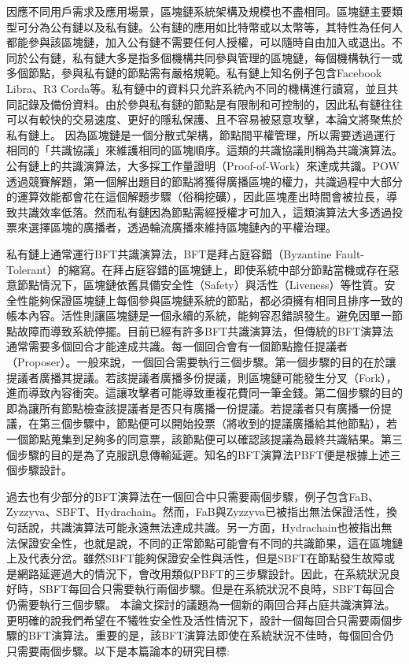 因應不同用戶需求及應用場景，區塊鏈系統架構及規模也不盡相同。區塊鏈主要類型可分為公有鏈以及私有鏈。公有鏈的應用如比特幣\cite{Bitcoin}或以太幣\cite{Ethereum}等，其特性為任何人都能參與該區塊鏈，加入公有鏈不需要任何人授權，可以隨時自由加入或退出。不同於公有鏈，私有鏈大多是指多個機構共同參與管理的區塊鏈，每個機構執行一或多個節點，參與私有鏈的節點需有嚴格規範。私有鏈上知名例子包含Facebook Libra\cite{STEVE_HANNA2010}、R3 Corda\cite{R3}等。私有鏈中的資料只允許系統內不同的機構進行讀寫，並且共同記錄及備份資料。由於參與私有鏈的節點是有限制和可控制的，因此私有鏈往往可以有較快的交易速度、更好的隱私保護、且不容易被惡意攻擊，本論文將聚焦於私有鏈上。
因為區塊鏈是一個分散式架構，節點間平權管理，所以需要透過運行相同的「共識協議」來維護相同的區塊順序。這類的共識協議則稱為共識演算法。公有鏈上的共識演算法，大多採工作量證明（Proof-of-Work）來達成共識。POW透過競賽解題，第一個解出題目的節點將獲得廣播區塊的權力，共識過程中大部分的運算效能都會花在這個解題步驟（俗稱挖礦），因此區塊產出時間會被拉長，導致共識效率低落。然而私有鏈因為節點需經授權才可加入，這類演算法大多透過投票來選擇區塊的廣播者，透過輪流廣播來維持區塊鏈內的平權治理。

私有鏈上通常運行BFT共識演算法，BFT是拜占庭容錯（Byzantine Fault-Tolerant）的縮寫。在拜占庭容錯的區塊鏈上，即使系統中部分節點當機或存在惡意節點情況下，區塊鏈依舊具備安全性（Safety）與活性（Liveness）等性質。安全性能夠保證區塊鏈上每個參與區塊鏈系統的節點，都必須擁有相同且排序一致的帳本內容。活性則讓區塊鏈是一個永續的系統，能夠容忍錯誤發生。避免因單一節點故障而導致系統停擺。目前已經有許多BFT共識演算法，但傳統的BFT演算法通常需要多個回合才能達成共識。每一個回合會有一個節點擔任提議者（Proposer）。一般來說，一個回合需要執行三個步驟。第一個步驟的目的在於讓提議者廣播其提議。若該提議者廣播多份提議，則區塊鏈可能發生分叉（Fork），進而導致內容衝突。這讓攻擊者可能導致重複花費同一筆金錢。第二個步驟的目的即為讓所有節點檢查該提議者是否只有廣播一份提議。若提議者只有廣播一份提議，在第三個步驟中，節點便可以開始投票（將收到的提議廣播給其他節點），若一個節點蒐集到足夠多的同意票，該節點便可以確認該提議為最終共識結果。第三個步驟的目的是為了克服訊息傳輸延遲。知名的BFT演算法PBFT\cite{castro1999practical}便是根據上述三個步驟設計。

過去也有少部分的BFT演算法在一個回合中只需要兩個步驟，例子包含FaB\cite{abraham2018revisiting}、Zyzzyva\cite{kotla2007zyzzyva}、SBFT\cite{martin2006fast}、Hydrachain\cite{Hydrachain}。然而，FaB與Zyzzyva已被指出無法保證活性，換句話說，共識演算法可能永遠無法達成共識。另一方面，Hydrachain也被指出無法保證安全性，也就是說，不同的正常節點可能會有不同的共識節果，這在區塊鏈上及代表分岔。雖然SBFT能夠保證安全性與活性，但是SBFT在節點發生故障或是網路延遲過大的情況下，會改用類似PBFT的三步驟設計。因此，在系統狀況良好時，SBFT每回合只需要執行兩個步驟。但是在系統狀況不良時，SBFT每回合仍需要執行三個步驟。
本論文探討的議題為一個新的兩回合拜占庭共識演算法。更明確的說我們希望在不犧牲安全性及活性情況下，設計一個每回合只需要兩個步驟的BFT演算法。重要的是，該BFT演算法即使在系統狀況不佳時，每個回合仍只需要兩個步驟。以下是本篇論本的研究目標: 

